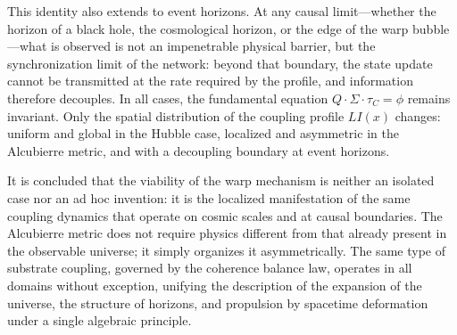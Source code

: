 \documentclass[10pt,a4paper,twocolumn]{article}
\begin{document}
This identity also extends to event horizons. At any causal limit---whether the horizon of a black hole, the cosmological horizon, or the edge of the warp bubble---what is observed is not an impenetrable physical barrier, but the synchronization limit of the network: beyond that boundary, the state update cannot be transmitted at the rate required by the profile, and information therefore decouples. In all cases, the fundamental equation \(Q \cdot \Sigma \cdot \tau_C = \phi\) remains invariant. Only the spatial distribution of the coupling profile \(LI(x)\) changes: uniform and global in the Hubble case, localized and asymmetric in the Alcubierre metric, and with a decoupling boundary at event horizons.

It is concluded that the viability of the warp mechanism is neither an isolated case nor an ad hoc invention: it is the localized manifestation of the same coupling dynamics that operate on cosmic scales and at causal boundaries. The Alcubierre metric does not require physics different from that already present in the observable universe; it simply organizes it asymmetrically. The same type of substrate coupling, governed by the coherence balance law, operates in all domains without exception, unifying the description of the expansion of the universe, the structure of horizons, and propulsion by spacetime deformation under a single algebraic principle.
\end{document}
